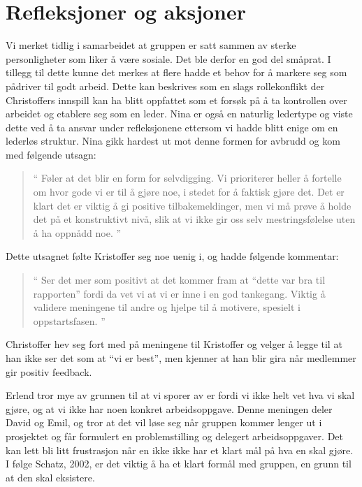 \section{Refleksjoner og aksjoner}

Vi merket tidlig i samarbeidet at gruppen er satt sammen av sterke personligheter som liker å være sosiale. Det ble derfor en god del småprat. I 
tillegg til dette kunne det merkes at flere hadde et behov for å markere seg som pådriver til godt arbeid. Dette kan beskrives som en slags 
rollekonflikt \cite{Artikkel2} der Christoffers innspill kan ha blitt oppfattet som et forsøk på å ta kontrollen over arbeidet og etablere seg som en 
leder. Nina er også en naturlig ledertype og viste dette ved å ta ansvar under refleksjonene ettersom vi hadde blitt enige om en lederløs 
struktur. Nina gikk hardest ut mot denne formen for avbrudd og kom med følgende utsagn: 

\begin{quote}``
Føler at det blir en form for selvdigging. Vi prioriterer heller å fortelle om hvor gode vi er til å gjøre noe, i 
stedet for å faktisk gjøre det. Det er klart det er viktig å gi positive tilbakemeldinger, men vi må prøve å holde det på et konstruktivt nivå, slik at vi ikke gir oss selv mestringsfølelse uten å ha oppnådd noe.
''\end{quote} 

Dette utsagnet følte Kristoffer seg noe uenig i, og hadde følgende kommentar:

\begin{quote}``
Ser det mer som positivt at det kommer fram at ``dette 
var bra til rapporten'' fordi da vet vi at vi er inne i en god tankegang. Viktig å validere meningene til andre og hjelpe til å motivere, spesielt i oppstartsfasen. 
''\end{quote}  
Christoffer hev seg fort med på meningene til Kristoffer og velger å legge til at han ikke ser det som at ``vi er best'', men kjenner at han 
blir gira når medlemmer gir positiv feedback. 

Erlend tror mye av grunnen til at vi sporer av er fordi vi ikke helt vet hva vi skal gjøre, og at vi ikke har noen konkret 
arbeidsoppgave. Denne meningen deler David og Emil, og tror at det vil løse seg når gruppen kommer lenger ut i prosjektet og får 
formulert en problemstilling og delegert arbeidsoppgaver. Det kan lett bli litt frustrasjon når en ikke ikke har et klart mål på hva en 
skal gjøre. I følge Schatz, 2002, er det viktig å ha et klart formål med gruppen, en grunn til at den skal eksistere. \cite{Artikkel3}

